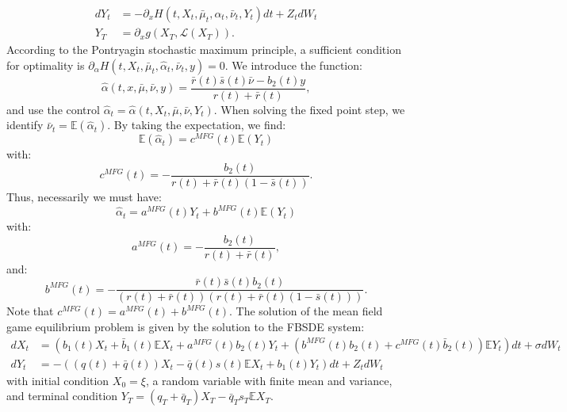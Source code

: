 \documentclass[11pt]{article}
\newcommand\cL{\mathcal L}
\begin{document}
\begin{equation*}
\begin{split}
    dY_t&=- \partial_x H(t,X_t,\bar{\mu}_t,\alpha_t,\bar{\nu}_t,Y_t)dt+Z_tdW_t \\
    Y_T&=\partial_xg(X_T, \cL(X_T)).
\end{split}
\end{equation*}
According to the Pontryagin stochastic maximum principle, a sufficient condition for optimality is $\partial_{\alpha}H(t,X_t,\bar{\mu}_t,\hat{\alpha}_t,\bar{\nu}_t,y)=0$. We introduce the function:
\begin{equation*}
    \hat{\alpha}(t,x,\bar{\mu},\bar{\nu},y)=\frac{\bar{r}(t)\bar{s}(t)\bar{\nu}-b_2(t)y}{r(t)+\bar{r}(t)},
\end{equation*}
and use the control $\hat{\alpha}_t=\hat{\alpha}(t,X_t,\bar{\mu},\bar{\nu},Y_t)$. When solving the fixed point step, we identify $\bar{\nu}_t=\mathbb{E}(\hat{\alpha}_t)$. By taking the expectation, we find:
\begin{equation*}
    \mathbb{E}(\hat{\alpha}_t)=c^{MFG}(t)\mathbb{E}(Y_t)
\end{equation*}
with:
\begin{equation*}
    c^{MFG}(t)=-\frac{b_2(t)}{r(t)+\bar{r}(t)(1-\bar{s}(t))}.
\end{equation*}
Thus, necessarily we must have:
\begin{equation*}
    \hat{\alpha}_t=a^{MFG}(t) Y_t+b^{MFG}(t)\mathbb{E}(Y_t)
\end{equation*}
with:
\begin{equation*}
    a^{MFG}(t)=-\frac{b_2(t)}{r(t)+\bar{r}(t)},
\end{equation*}
and:
\begin{equation*}
    b^{MFG}(t)=-\frac{\bar{r}(t)\bar{s}(t)b_2(t)}{(r(t)+\bar{r}(t))(r(t)+\bar{r}(t)(1-\bar{s}(t)))}.
\end{equation*}
Note that $c^{MFG}(t)=a^{MFG}(t)+b^{MFG}(t)$. The solution of the mean field game equilibrium problem is given by the solution to the FBSDE system:
\begin{equation}
\begin{split}
        dX_t&=\left(b_1(t)X_t+\bar{b}_1(t) \mathbb{E}X_t+a^{MFG}(t)b_2(t)Y_t+(b^{MFG}(t)b_2(t)+c^{MFG}(t)\bar{b}_2(t))\mathbb{E}Y_t\right)dt+\sigma dW_t \\
        dY_t&=-\left((q(t)+\bar{q}(t))X_t-\bar{q}(t)s(t)\mathbb{E}X_t+b_1(t)Y_t \right)dt +Z_t dW_t
\end{split}
\label{eq:FBSDE_EMFG}
\end{equation}
with initial condition $X_0=\xi$, a random variable with finite mean and variance, and terminal condition $Y_T=(q_T+\bar{q}_T)X_T-\bar{q}_Ts_T\mathbb{E}X_T$.
\end{document}
